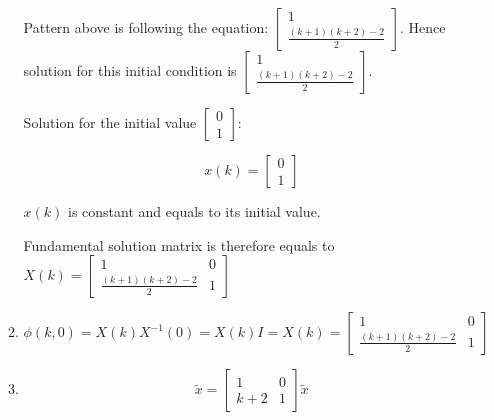 \documentclass[12pt,a4paper, margin=1in]{article}
\newcommand\ddfrac[2]{\frac{\displaystyle #1}{\displaystyle #2}}
\begin{document}
\begin{enumerate}
\begin{enumerate}
                Pattern above is following the equation: $\begin{bmatrix}1 \\ \ddfrac{(k+1)(k+2)-2}{2}\end{bmatrix}$. Hence solution for this initial condition is 
                $\begin{bmatrix}1 \\ \ddfrac{(k+1)(k+2)-2}{2}\end{bmatrix}$.
                
                \bigskip \bigskip
                Solution for the initial value $\begin{bmatrix}0 \\ 1\end{bmatrix}$:

                \begin{equation*}
                    x(k) = \begin{bmatrix}0 \\ 1\end{bmatrix}
                \end{equation*}

                $x(k)$ is constant and equals to its initial value.

                Fundamental solution matrix is therefore equals to $X(k) = \begin{bmatrix}
                    1 & 0 \\ \ddfrac{(k+1)(k+2)-2}{2} & 1
                \end{bmatrix}$
            \item 
                \begin{equation*}
                    \phi(k, 0) = X(k)X^{-1}(0) = X(k)I = X(k) = \begin{bmatrix}
                        1 & 0 \\ \ddfrac{(k+1)(k+2)-2}{2} & 1
                    \end{bmatrix}
                \end{equation*}
            \item 
                \begin{equation*}
                    \tilde{x} = \begin{bmatrix}
                        1 & 0 \\
                        k+2 & 1
                    \end{bmatrix}\tilde{x}
                \end{equation*}


\end{enumerate}
\end{enumerate}
\end{document}
